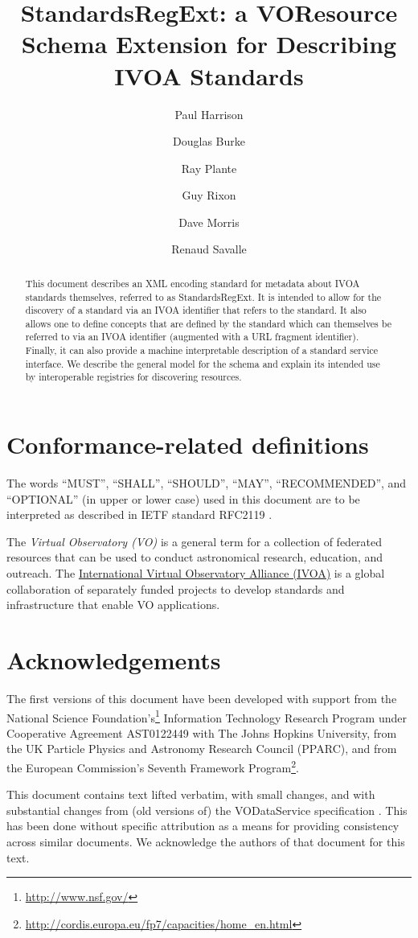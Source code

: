 \documentclass[11pt,a4paper]{ivoa}
\author[http://www.ivoa.net/twiki/bin/view/IVOA/PaulHarrison]{Paul Harrison}
\author[http://www.ivoa.net/twiki/bin/view/IVOA/DougBurke]{Douglas Burke}
\author[http://www.ivoa.net/twiki/bin/view/IVOA/RayPlante]{Ray Plante}
\author[http://www.ivoa.net/twiki/bin/view/IVOA/GuyRixon]{Guy Rixon}
\author[http://www.ivoa.net/twiki/bin/view/IVOA/DaveMorris]{Dave Morris}
\author[http://www.ivoa.net/twiki/bin/view/IVOA/RenaudSavalle]{Renaud Savalle}
\title{StandardsRegExt: a VOResource Schema Extension for Describing
IVOA Standards}
\begin{document}
\begin{abstract}
This document describes an XML encoding standard for metadata about
IVOA standards themselves, referred to as StandardsRegExt.  It is intended
to allow for the discovery of a standard via an IVOA identifier that
refers to the standard.  It also allows one to define concepts that
are defined by the standard which can themselves be referred to via an
IVOA identifier (augmented with a URL fragment identifier).  Finally,
it can also provide a machine interpretable description of a standard
service interface.  We describe the general model for the schema and
explain its intended use by interoperable registries for discovering
resources.
\end{abstract}


\section*{Conformance-related definitions}

The words ``MUST'', ``SHALL'', ``SHOULD'', ``MAY'', ``RECOMMENDED'', and
``OPTIONAL'' (in upper or lower case) used in this document are to be
interpreted as described in IETF standard RFC2119 \citep{std:RFC2119}.

The \emph{Virtual Observatory (VO)} is a
general term for a collection of federated resources that can be used
to conduct astronomical research, education, and outreach.
The \href{https://www.ivoa.net}{International
Virtual Observatory Alliance (IVOA)} is a global
collaboration of separately funded projects to develop standards and
infrastructure that enable VO applications.

\section*{Acknowledgements}

The first versions of this document have been developed with support from the
National Science Foundation's\footnote{\url{http://www.nsf.gov/}}
Information Technology Research Program under Cooperative Agreement
AST0122449 with The Johns Hopkins University, from the
UK Particle Physics and Astronomy Research Council
(PPARC), and from the
European Commission's Seventh Framework
Program\footnote{\url{http://cordis.europa.eu/fp7/capacities/home_en.html}}.

This document contains text lifted verbatim, with small changes, and
with substantial changes from (old versions of) the VODataService
specification \citep{2021ivoa.spec.1102D}.  This
has been done without specific attribution as a means for providing
consistency across similar documents.  We acknowledge the authors of
that document for this text.
\end{document}
